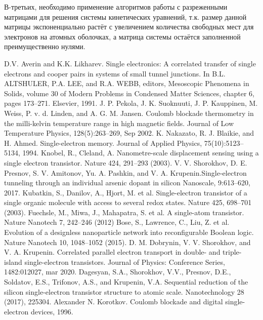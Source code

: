 \documentclass[12pt,a4paper]{report}
\begin{document}
В-третьих, необходимо применение алгоритмов работы с разреженными матрицами для решения системы кинетических уравнений, т.к. размер данной матрицы экспоненциально растёт с увеличением количества свободных мест для электронов на атомных оболочках, а матрица системы остаётся заполненной преимущественно нулями.
\renewcommand\bibname{Cписок литературы}
\begin{thebibliography}{99}

	D.V. Averin and K.K. Likharev. Single electronics: A correlated transfer of single
electrons and cooper pairs in systems of small tunnel junctions. In B.L. ALTSHULER,
P.A. LEE, and R.A. WEBB, editors, Mesoscopic Phenomena in Solids, volume 30 of
Modern Problems in Condensed Matter Sciences, chapter 6, pages 173–271. Elsevier,
1991.
	 J. P. Pekola, J. K. Suoknuuti, J. P. Kauppinen, M. Weiss, P. v. d. Linden, and A. G. M.
Jansen. Coulomb blockade thermometry in the milli-kelvin temperature range in high
magnetic fields. Journal of Low Temperature Physics, 128(5):263–269, Sep 2002.
	 K. Nakazato, R. J. Blaikie, and H. Ahmed. Single-electron memory. Journal of Applied
Physics, 75(10):5123–5134, 1994.
	 Knobel, R., Cleland, A. Nanometre-scale displacement sensing using a single electron transistor. Nature 424, 291–293 (2003).
	 V. V. Shorokhov, D. E. Presnov, S. V. Amitonov, Yu. A. Pashkin, and V. A. Krupenin.Single-electron tunneling through an individual arsenic dopant in silicon
Nanoscale, 9:613–620, 2017.
	 Kubatkin, S., Danilov, A., Hjort, M. et al. Single-electron transistor of a single organic molecule with access to several redox states. Nature 425, 698–701 (2003).
	 Fuechsle, M., Miwa, J., Mahapatra, S. et al. A single-atom transistor. Nature Nanotech 7, 242–246 (2012)
		 Bose, S., Lawrence, C., Liu, Z. et al. Evolution of a designless nanoparticle network into reconfigurable Boolean logic. Nature Nanotech 10, 1048–1052 (2015).
	 D. M. Dobrynin, V. V. Shorokhov, and V. A. Krupenin. Correlated parallel electron
transport in double- and triple-island single-electron transistors. Journal of Physics: Conference Series, 1482:012027, mar 2020.
	 Dagesyan, S.A., Shorokhov, V.V., Presnov, D.E., Soldatov, E.S., Trifonov, A.S., and Krupenin, V.A. Sequential reduction of the silicon single-electron transistor structure to atomic scale. Nanotechnology 28 (2017), 225304.
	 Alexander N. Korotkov. Coulomb blockade and digital single-electron devices, 1996.

\end{thebibliography}
\end{document}
